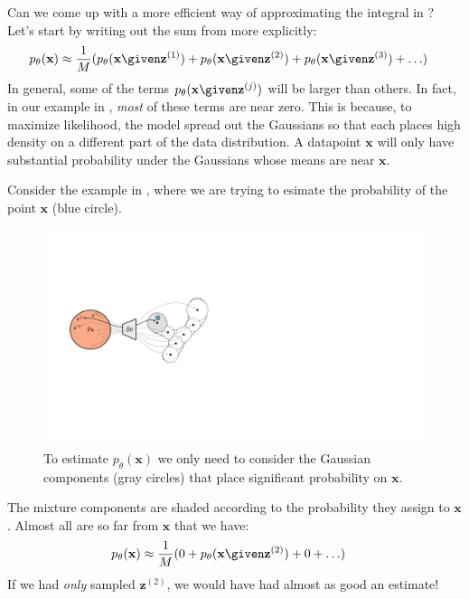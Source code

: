 Can we come up with a more efficient way of approximating the integral in \eqn{\ref{eqn:generative_models_and_representation_learning:vae_likelihood}}? Let's start by writing out the sum from \eqn{\ref{eqn:generative_models_and_representation_learning:vae_likelihood_monte_carlo_estimate}} more explicitly:
\begin{align}
    p_{\theta}(\mathbf{x}) &\approx \frac{1}{M} (p_{\theta}(\mathbf{x} \given \mathbf{z}^{(1)}) + p_{\theta}(\mathbf{x} \given \mathbf{z}^{(2)}) + p_{\theta}(\mathbf{x} \given \mathbf{z}^{(3)}) + \ldots)
\end{align}
In general, some of the terms $p_{\theta}(\mathbf{x} \given \mathbf{z}^{(j)})$ will be larger than others. In fact, in our example in \fig{\ref{fig:generative_modeling_and_representation_learning:IGMM_training_iters}}, \textit{most} of these terms are near zero. This is because, to maximize likelihood, the model spread out the Gaussians so that each places high density on a different part of the data distribution. A datapoint $\mathbf{x}$ will only have substantial probability under the Gaussians whose means are near $\mathbf{x}$. 

Consider the example in \fig{\ref{fig:generative_modeling_and_representation_learning:vae_importance_sampling1}}, where we are trying to esimate the probability of the point $\mathbf{x}$ (blue circle). 
\begin{figure}[h!]
    \centerline{
    \includegraphics[width=0.5\linewidth]{./figures/generative_modeling_and_representation_learning/vae_importance_sampling1.pdf}
    }
    \caption{To estimate $p_{\theta}(\mathbf{x})$ we only need to consider the Gaussian components (gray circles) that place significant probability on $\mathbf{x}$.}
    \label{fig:generative_modeling_and_representation_learning:vae_importance_sampling1}
\end{figure}
The mixture components are shaded according to the probability they assign to $\mathbf{x}$. Almost all are so far from $\mathbf{x}$ that we have:
\begin{align}
    p_{\theta}(\mathbf{x}) &\approx \frac{1}{M} (0 + p_{\theta}(\mathbf{x} \given \mathbf{z}^{(2)}) + 0 + \ldots)
\end{align}
If we had \textit{only} sampled $\mathbf{z}^{(2)}$, we would have had almost as good an estimate!

